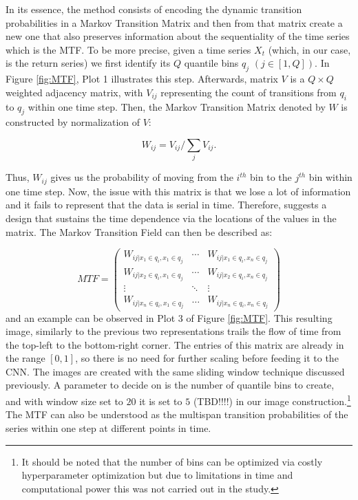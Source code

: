 \documentclass[11pt, a4paper]{article}
\begin{document}
In its essence, the method consists of encoding the dynamic transition probabilities in a Markov Transition Matrix and then from that matrix create a new one that also preserves information about the sequentiality of the time series which is the MTF.
To be more precise, given a time series $X_t$ (which, in our case, is the return series) we first identify its $Q$ quantile bins $q_j$ $(j \in [1,Q])$. In Figure \ref{fig:MTF}, Plot 1 illustrates this step. Afterwards, matrix $V$ is a $Q \times Q$ weighted adjacency matrix, with $V_{ij}$ representing the count of transitions from $q_i$ to $q_j$ within one time step. 
Then, the Markov Transition Matrix denoted by $W$ is constructed by normalization of $V$:

\begin{equation}
\label{eq:W}
    W_{ij} = V_{ij}/\sum_j V_{ij}.
\end{equation}

Thus, $W_{ij}$ gives us the probability of moving from the $i^{th}$ bin to the $j^{th}$ bin within one time step. Now, the issue with this matrix is that we lose a lot of information and it fails to represent that the data is serial in time. Therefore, \cite{wang2015encoding} suggests a design that sustains the time dependence via the locations of the values in the matrix. The Markov Transition Field can then be described as:

\begin{equation}
    \label{eq:MTF}
        MTF =\begin{pmatrix} 
    W_{ij|x_1 \in q_i, x_1 \in q_j} & \cdots & W_{ij|x_1 \in q_i, x_n \in q_j}\\
    W_{ij|x_2 \in q_i, x_1 \in q_j} & \cdots & W_{ij|x_2 \in q_i, x_n \in q_j}\\
    \vdots & \ddots & \vdots\\
    W_{ij|x_n \in q_i, x_1 \in q_j} & \dots & W_{ij|x_n \in q_i, x_n \in q_j}
    \end{pmatrix}
\end{equation}
and an example can be observed in Plot 3 of Figure \ref{fig:MTF}. This resulting image, similarly to the previous two representations trails the flow of time from the top-left to the bottom-right corner.
The entries of this matrix are already in the range $[0,1]$, so there is no need for further scaling before feeding it to the CNN. The images are created with the same sliding window technique discussed previously. A parameter to decide on is the number of quantile bins to create, and with window size set to $20$ it is set to $5$ (TBD!!!!) in our image construction.\footnote{It should be noted that the number of bins can be optimized via costly hyperparameter optimization but due to limitations in time and computational power this was not carried out in the study.}
The MTF can also be understood as the multispan transition probabilities of the series within one step at different points in time.
\end{document}
